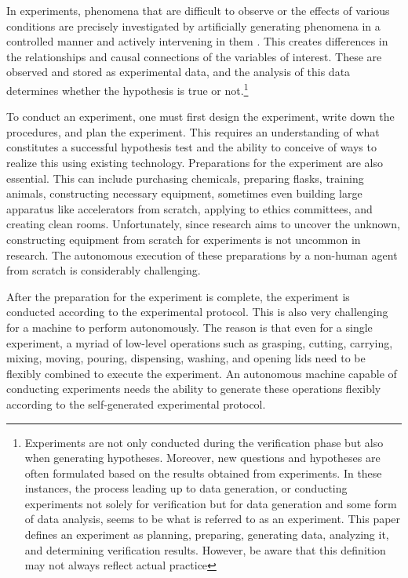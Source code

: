 In experiments, phenomena that are difficult to observe or the effects of various conditions are precisely investigated by artificially generating phenomena in a controlled manner and actively intervening in them \cite{radder2009philosophy}. This creates differences in the relationships and causal connections of the variables of interest. These are observed and stored as experimental data, and the analysis of this data determines whether the hypothesis is true or not.\footnote{
Experiments are not only conducted during the verification phase but also when generating hypotheses. Moreover, new questions and hypotheses are often formulated based on the results obtained from experiments. In these instances, the process leading up to data generation, or conducting experiments not solely for verification but for data generation and some form of data analysis, seems to be what is referred to as an experiment. This paper defines an experiment as planning, preparing, generating data, analyzing it, and determining verification results. However, be aware that this definition may not always reflect actual practice
}

To conduct an experiment, one must first design the experiment, write down the procedures, and plan the experiment. This requires an understanding of what constitutes a successful hypothesis test and the ability to conceive of ways to realize this using existing technology. Preparations for the experiment are also essential. This can include purchasing chemicals, preparing flasks, training animals, constructing necessary equipment, sometimes even building large apparatus like accelerators from scratch, applying to ethics committees, and creating clean rooms. Unfortunately, since research aims to uncover the unknown, constructing equipment from scratch for experiments is not uncommon in research. The autonomous execution of these preparations by a non-human agent from scratch is considerably challenging.

After the preparation for the experiment is complete, the experiment is conducted according to the experimental protocol. This is also very challenging for a machine to perform autonomously. The reason is that even for a single experiment, a myriad of low-level operations such as grasping, cutting, carrying, mixing, moving, pouring, dispensing, washing, and opening lids need to be flexibly combined to execute the experiment. An autonomous machine capable of conducting experiments needs the ability to generate these operations flexibly according to the self-generated experimental protocol.

